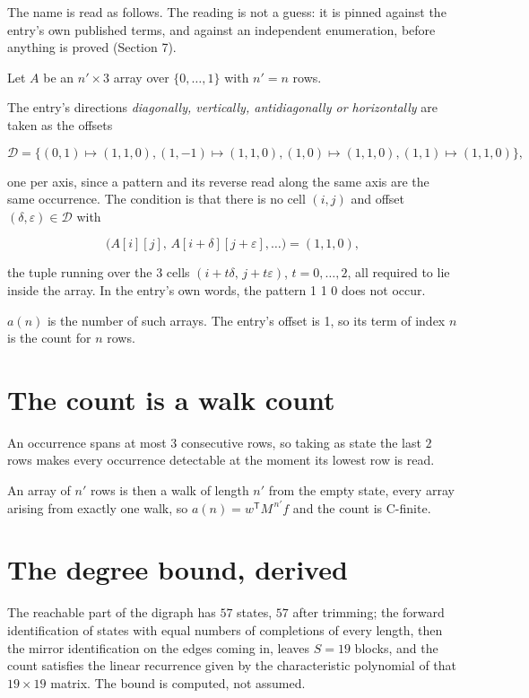 \documentclass[11pt]{article}
\theoremstyle{definition}
\begin{document}
The name is read as follows. The reading is not a guess: it is pinned against the entry's own published terms, and against an independent enumeration, before anything is proved (Section 7).

Let $A$ be an $n' \times 3$ array over $\{0,\dots,1\}$ with $n' = n$ rows.

The entry's directions {\itshape diagonally, vertically, antidiagonally or horizontally} are taken as the offsets

\[\mathcal{D} = \{(0,1)\mapsto(1,1,0), (1,-1)\mapsto(1,1,0), (1,0)\mapsto(1,1,0), (1,1)\mapsto(1,1,0)\},\]

one per axis, since a pattern and its reverse read along the same axis are the same occurrence. The condition is that there is no cell $(i,j)$ and offset $(\delta,\varepsilon)\in\mathcal{D}$ with

\[\bigl(A[i][j],\,A[i{+}\delta][j{+}\varepsilon],\dots\bigr) = (1, 1, 0),\]

the tuple running over the $3$ cells $(i+t\delta,\,j+t\varepsilon)$, $t = 0,\dots,2$, all required to lie inside the array. In the entry's own words, the pattern 1 1 0 does not occur.

$a(n)$ is the number of such arrays. The entry's offset is 1, so its term of index $n$ is the count for $n$ rows.

\section{The count is a walk count}

An occurrence spans at most $3$ consecutive rows, so taking as state the last $2$ rows makes every occurrence detectable at the moment its lowest row is read.

An array of $n'$ rows is then a walk of length $n'$ from the empty state, every array arising from exactly one walk, so $a(n) = w^{\mathsf T}M^{\,n'}f$ and the count is C-finite.

\section{The degree bound, derived}

The reachable part of the digraph has $57$ states, $57$ after trimming; the forward identification of states with equal numbers of completions of every length, then the mirror identification on the edges coming in, leaves $S = 19$ blocks, and the count satisfies the linear recurrence given by the characteristic polynomial of that $19\times19$ matrix. The bound is computed, not assumed.
\end{document}
